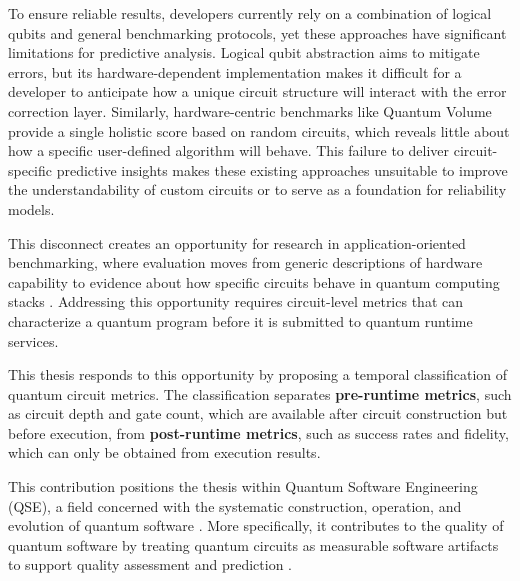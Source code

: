 \documentclass{article}
\begin{document}
To ensure reliable results, developers currently rely on a combination of logical qubits and general benchmarking protocols, yet these approaches have significant limitations for predictive analysis. Logical qubit abstraction aims to mitigate errors, but its hardware-dependent implementation makes it difficult for a developer to anticipate how a unique circuit structure will interact with the error correction layer. Similarly, hardware-centric benchmarks like Quantum Volume \cite{proctorBenchmarkingQuantumComputers2025_2025} provide a single holistic score based on random circuits, which reveals little about how a specific user-defined algorithm will behave. This failure to deliver circuit-specific predictive insights makes these existing approaches unsuitable to improve the understandability of custom circuits or to serve as a foundation for reliability models.

This disconnect creates an opportunity for research in application-oriented benchmarking, where evaluation moves from generic descriptions of hardware capability to evidence about how specific circuits behave in quantum computing stacks \cite{millsApplicationMotivatedHolistic2021, lubinskiApplicationOrientedPerformanceBenchmarks_2023}. Addressing this opportunity requires circuit-level metrics that can characterize a quantum program before it is submitted to quantum runtime services.

This thesis responds to this opportunity by proposing a temporal classification of quantum circuit metrics. The classification separates \textbf{pre-runtime metrics}, such as circuit depth and gate count, which are available after circuit construction but before execution, from \textbf{post-runtime metrics}, such as success rates and fidelity, which can only be obtained from execution results.

This contribution positions the thesis within Quantum Software Engineering (QSE), a field concerned with the systematic construction, operation, and evolution of quantum software \cite{Piattini2020}. More specifically, it contributes to the quality of quantum software by treating quantum circuits as measurable software artifacts to support quality assessment and prediction \cite{cruz-lemusQuantumSoftwareQuality_2024}.
\end{document}
